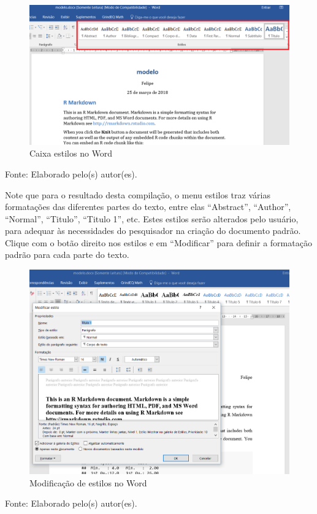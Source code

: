 \documentclass[12pt,brazil,oneside]{book}
\begin{document}
\begin{figure}[H]

{\centering \includegraphics[width=0.7\linewidth]{rmarkestilos} 

}

\caption{Caixa estilos no Word}\label{fig:rmarkestilos}
\end{figure}

Fonte: Elaborado pelo(s) autor(es).

Note que para o resultado desta compilação, o menu estilos traz várias formatações das diferentes partes do texto, entre elas ``Abstract'', ``Author'', ``Normal'', ``Titulo'', ``Titulo 1'', etc. Estes estilos serão alterados pelo usuário, para adequar às necessidades do pesquisador na criação do documento padrão. Clique com o botão direito nos estilos e em ``Modificar'' para definir a formatação padrão para cada parte do texto.

\begin{figure}[H]

{\centering \includegraphics[width=0.7\linewidth]{rmarkestilos1} 

}

\caption{Modificação de estilos no Word}\label{fig:rmarkestilos1}
\end{figure}

Fonte: Elaborado pelo(s) autor(es).
\end{document}
